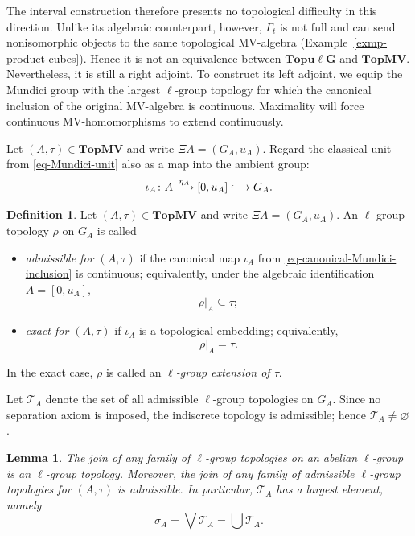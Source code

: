 \documentclass[preprint,3p]{elsarticle}
\theoremstyle{plain}
\newtheorem{lem}[thm]{Lemma}
\theoremstyle{definition}
\newtheorem{defn}[thm]{Definition}
\newcommand{\longhookrightarrow}{\lhook\joinrel\longrightarrow}
\newcommand{\TopMV}{\mathbf{TopMV}}
\newcommand{\Topulg}{\mathbf{Topu\ell G}}
\numberwithin{equation}{section}
\begin{document}
The interval construction therefore presents no topological difficulty in
this direction.  Unlike its algebraic counterpart, however, $\Gamma_t$
is not full and can send nonisomorphic objects to the same topological
MV-algebra (Example~\ref{exmp-product-cubes}).  Hence it is not an
equivalence between $\Topulg$ and $\TopMV$.  Nevertheless, it
is still a right adjoint.  To construct its left adjoint, we equip the
Mundici group with the largest $\ell$-group topology for which the canonical
inclusion of the original MV-algebra is continuous.  Maximality will force
continuous MV-homomorphisms to extend continuously.

Let $(A,\tau)\in\TopMV$ and write $\Xi A=(G_A,u_A)$.
Regard the classical unit from \eqref{eq-Mundici-unit} also as a map into
the ambient group:
\begin{equation}
\label{eq-canonical-Mundici-inclusion}
 \iota_A\colon
 A\xrightarrow{\eta_A}[0,u_A]\longhookrightarrow G_A.
\end{equation}

\begin{defn}
\label{def-admissible-topology}
Let $(A,\tau)\in\TopMV$ and write $\Xi A=(G_A,u_A)$.
An $\ell$-group topology $\rho$ on $G_A$ is called
\begin{itemize}
\item \emph{admissible for $(A,\tau)$} if the canonical map $\iota_A$
from \eqref{eq-canonical-Mundici-inclusion} is continuous;
equivalently, under the algebraic identification $A=[0,u_A]$,
\[
 \rho|_A\subseteq\tau;
\]
\item \emph{exact for $(A,\tau)$} if $\iota_A$ is a topological embedding;
equivalently,
\[
 \rho|_A=\tau.
\]
\end{itemize}
In the exact case, $\rho$ is called an
\emph{$\ell$-group extension of $\tau$}.
\end{defn}

Let $\mathcal T_A$ denote the set of all admissible
$\ell$-group topologies on $G_A$.  Since no separation
axiom is imposed, the indiscrete topology is admissible;
hence $\mathcal T_A\neq\varnothing$.

\begin{lem}
\label{lem-finest-admissible}
The join of any family of $\ell$-group topologies on an
abelian $\ell$-group is an $\ell$-group topology.
Moreover, the join of any family of admissible $\ell$-group
topologies for $(A,\tau)$ is admissible.
In particular, $\mathcal T_A$ has a largest element, namely
\begin{equation}
\label{eq-largest-admissible-topology}
 \sigma_A=\bigvee\mathcal T_A=\bigcup\mathcal T_A .
\end{equation}
\end{lem}
\end{document}
